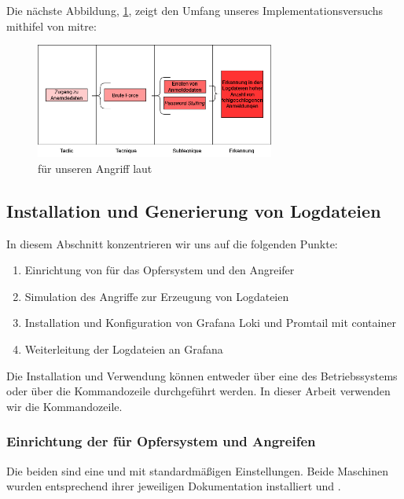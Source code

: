 Die nächste Abbildung, \ref{fig:Unser_ttp}, zeigt den Umfang unseres Implementationsversuchs mithifel von \gls{mitre}:
\begin{figure}[H]
   \centering
   \includegraphics[width=0.7\textwidth]{assets/T1110.drawio.png}
   \caption[ für unseren Angriff]
   { für unseren Angriff laut \cite{Mitre_t1110}}
   \label{fig:Unser_ttp}
   \centering
\end{figure}

\newpage
\subsection{Installation und Generierung von Logdateien}
In diesem Abschnitt konzentrieren wir uns auf die folgenden Punkte:

\begin{enumerate}[noitemsep]
   \item Einrichtung von  für das Opfersystem und den Angreifer
   \item Simulation des Angriffe zur Erzeugung von Logdateien
   \item Installation und Konfiguration von Grafana Loki und Promtail mit \gls{container}
   \item Weiterleitung der Logdateien an Grafana
\end{enumerate}

Die Installation und Verwendung können entweder über eine  des Betriebssystems oder über die Kommandozeile durchgeführt werden. In dieser Arbeit verwenden wir die Kommandozeile.

\subsubsection{Einrichtung der  für Opfersystem und Angreifen}
Die beiden  sind eine  und  mit standardmäßigen Einstellungen. Beide Maschinen wurden entsprechend ihrer jeweiligen Dokumentation installiert \citep{kali_vm} und \citep{Ubuntu_server}.

